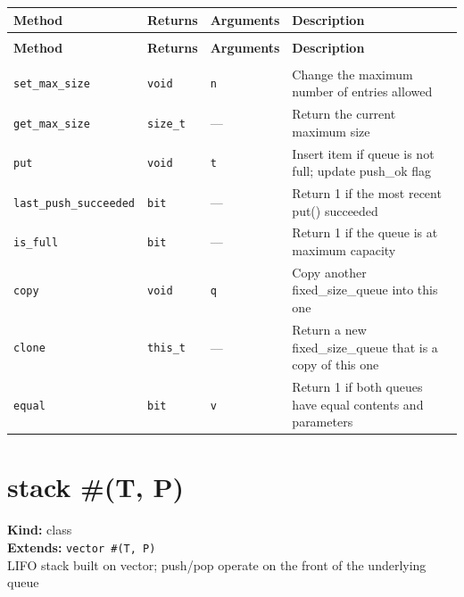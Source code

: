 \documentclass[11pt,letterpaper]{report}
\begin{document}
\begin{xltabular}{\linewidth}{>{\small}p{1.35in} >{\small}p{1.25in} >{\small}p{0.95in} >{\small}X}
\toprule
\textbf{Method} & \textbf{Returns} & \textbf{Arguments} & \textbf{Description} \\
\midrule
\endfirsthead
{} \\
\midrule
\textbf{Method} & \textbf{Returns} & \textbf{Arguments} & \textbf{Description} \\
\midrule
\endhead
\midrule
{} \\
\endfoot
\bottomrule
\endlastfoot
\texttt{set\_max\_size} & \texttt{void} & \texttt{n} & Change the maximum number of entries allowed \\
\texttt{get\_max\_size} & \texttt{size\_t} & --- & Return the current maximum size \\
\texttt{put} & \texttt{void} & \texttt{t} & Insert item if queue is not full; update push\_ok flag \\
\texttt{last\_push\_succeeded} & \texttt{bit} & --- & Return 1 if the most recent put() succeeded \\
\texttt{is\_full} & \texttt{bit} & --- & Return 1 if the queue is at maximum capacity \\
\texttt{copy} & \texttt{void} & \texttt{q} & Copy another fixed\_size\_queue into this one \\
\texttt{clone} & \texttt{this\_t} & --- & Return a new fixed\_size\_queue that is a copy of this one \\
\texttt{equal} & \texttt{bit} & \texttt{v} & Return 1 if both queues have equal contents and parameters \\
\end{xltabular}

\section{stack \#(T, P)}
\label{cls:stackTP}

\noindent\textbf{Kind:} class\\
\noindent\textbf{Extends:} \texttt{vector \#(T, P)}\\
\noindent LIFO stack built on vector; push/pop operate on the front of the underlying queue
\end{document}
